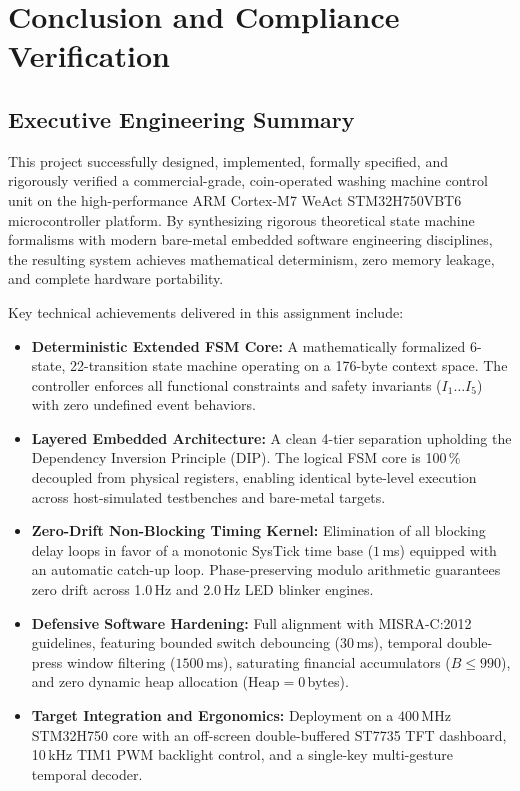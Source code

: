 \section{Conclusion and Compliance Verification}
\label{sec:conclusion}

\subsection{Executive Engineering Summary}

This project successfully designed, implemented, formally specified, and rigorously verified a commercial-grade, coin-operated washing machine control unit on the high-performance ARM Cortex-M7 WeAct STM32H750VBT6 microcontroller platform. By synthesizing rigorous theoretical state machine formalisms with modern bare-metal embedded software engineering disciplines, the resulting system achieves mathematical determinism, zero memory leakage, and complete hardware portability.

Key technical achievements delivered in this assignment include:
\begin{itemize}
  \item \textbf{Deterministic Extended FSM Core:} A mathematically formalized 6-state, 22-transition state machine operating on a 176-byte context space. The controller enforces all functional constraints and safety invariants ($I_1 \dots I_5$) with zero undefined event behaviors.
  \item \textbf{Layered Embedded Architecture:} A clean 4-tier separation upholding the Dependency Inversion Principle (DIP). The logical FSM core is 100\,\% decoupled from physical registers, enabling identical byte-level execution across host-simulated testbenches and bare-metal targets.
  \item \textbf{Zero-Drift Non-Blocking Timing Kernel:} Elimination of all blocking delay loops in favor of a monotonic SysTick time base ($1$\,ms) equipped with an automatic catch-up loop. Phase-preserving modulo arithmetic guarantees zero drift across 1.0\,Hz and 2.0\,Hz LED blinker engines.
  \item \textbf{Defensive Software Hardening:} Full alignment with MISRA-C:2012 guidelines, featuring bounded switch debouncing ($30$\,ms), temporal double-press window filtering ($1500$\,ms), saturating financial accumulators ($B \le 990$\cent), and zero dynamic heap allocation ($\text{Heap} = 0$\,bytes).
  \item \textbf{Target Integration and Ergonomics:} Deployment on a $400$\,MHz STM32H750 core with an off-screen double-buffered ST7735 TFT dashboard, 10\,kHz TIM1 PWM backlight control, and a single-key multi-gesture temporal decoder.
\end{itemize}

